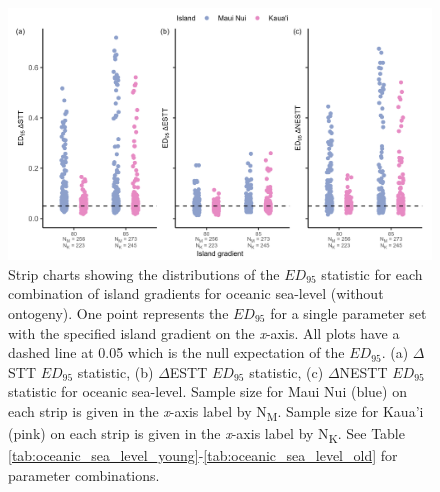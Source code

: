 \begin{figure}
    \centering
    \includegraphics[width=\textwidth]{JBI-21-0508_FigS7.png}
    \caption{Strip charts showing the distributions of the $ED_{95}$ statistic for each combination of island gradients for oceanic sea-level (without ontogeny). One point represents the $ED_{95}$ for a single parameter set with the specified island gradient on the \textit{x}-axis. All plots have a dashed line at 0.05 which is the null expectation of the $ED_{95}$. (a) $\Delta$STT $ED_{95}$ statistic, (b) $\Delta$ESTT $ED_{95}$ statistic, (c) $\Delta$NESTT $ED_{95}$ statistic for oceanic sea-level. Sample size for Maui Nui (blue) on each strip is given in the \textit{x}-axis label by N\textsubscript{M}. Sample size for Kaua'i (pink) on each strip is given in the \textit{x}-axis label by N\textsubscript{K}. See Table \ref{tab:oceanic_sea_level_young}-\ref{tab:oceanic_sea_level_old} for parameter combinations.}
    \label{fig:oceanic_sea_level_gradient_nltt}
\end{figure}

